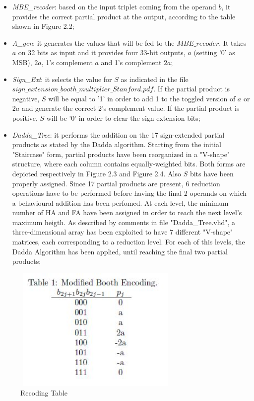 \begin{itemize}
 
\item \emph{MBE\_recoder}: based on the input triplet coming from the operand $b$, it provides the correct partial product 
at the output, according to the table shown in Figure 2.2;

\item \emph{A\_gen}: it generates the values that will be fed to the $MBE\_recoder$. It takes
$a$ on 32 bits as input and it provides four 33-bit outputs, $a$ (setting '0' as MSB), $2a$,
1's complement $a$ and 1's complement $2a$;

\item \emph{Sign\_Ext}: it selects the value for $S$ as indicated in the file
$sign\_extension\_booth\_multiplier\_Stanford.pdf$. If the partial product is negative, $S$ will be 
equal to '1' in order to add 1 to the toggled version of $a$ or $2a$ and generate the correct
2's complement value. If the partial product is positive, $S$ will be '0' in order to clear
the sign extension bits;

\item \emph{Dadda\_Tree}: it performs the addition on the 17 sign-extended partial products as
stated by the Dadda algorithm. Starting from the initial "Staircase" form, partial products have been reorganized in a "V-shape" structure, where each column contains equally-weighted bits. Both forms are depicted respectively in Figure 2.3 and Figure 2.4. Also $S$
bits have been properly assigned. Since 17 partial products are present, 6 reduction operations have to be performed before having the final 2 operands on which a behavioural
addition has been perfomed. At each level, the minimum number of HA and FA have been assigned
in order to reach the next level's maximum heigth. As described by comments in file "Dadda\_Tree.vhd", a three-dimensional array has been exploited to have 7 different "V-shape" matrices, each corresponding to a reduction level. For each of this levels, the Dadda Algorithm has been applied, until reaching the final two partial products;

\end{itemize}


\begin{figure}[H]
	\centering
	\includegraphics[width=8cm, height=6cm]{img/MBE.jpeg} 
	\caption{Recoding Table}
	\label{Recoding Table} 
\end{figure}

